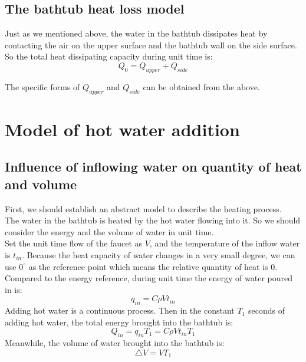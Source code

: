 \documentclass{mcmthesis}
\begin{document}
\subsection{The bathtub heat loss model} 	%

\indent Just as we mentioned above, the water in the bathtub dissipates heat by contacting the air on the upper surface and the bathtub wall on the side surface. \\

\indent So the total heat dissipating capacity during unit time is:
\begin{equation}
	Q_{0}=Q_{upper}+Q_{side}
\end{equation}


\indent The specific forms of $Q_{upper}$ and $Q_{side}$ can be obtained from the above. 

\section{Model of hot water addition}
\subsection{Influence of inflowing water on quantity of heat and volume}
\indent First, we should establish an abstract model to describe the heating process.\\
\indent The water in the bathtub is heated by the hot water flowing into it. So we should consider the energy and the volume of water in unit time. \\
\indent Set the unit time flow of the faucet as $ V $, and the temperature of the inflow water is $ t_{in}$. Because the  heat capacity of water changes in a very small degree, we can use $0^{\circ}$ as the reference point which means the relative quantity of heat is 0.\\
\indent Compared to the energy reference, during unit time the energy of water poured in is:
\begin{equation}
	q_{in}=C\rho Vt_{in} 
\end{equation}
\indent Adding hot water is a continuous process. Then in the constant $ T_{1} $ seconds of adding hot water, the total energy brought into the bathtub is:
\begin{equation}
	Q_{in}=q_{in}T_{1}=C\rho Vt_{in}T_{1}
\end{equation}
\indent Meanwhile, the volume of water brought into the bathtub is:
\begin{equation}
	\bigtriangleup V=VT_{1} 
\end{equation}
\end{document}

